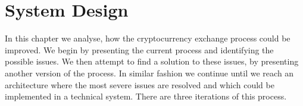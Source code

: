 \section{System Design}\label{sec:system-design}
% 
In this chapter we analyse, how the cryptocurrency exchange process could be improved. We begin by presenting the current process and identifying the possible issues. We then attempt to find a solution to these issues, by presenting another version of the process. In similar fashion we continue until we reach an architecture where the most severe issues are resolved and which could be implemented in a technical system. There are three iterations of this process.



